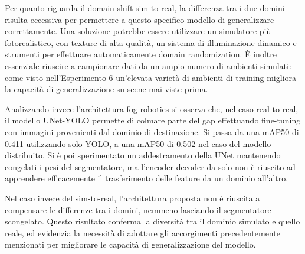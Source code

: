 \documentclass[12pt]{report}
\begin{document}
Per quanto riguarda il domain shift sim-to-real, la differenza tra i due domini risulta eccessiva per permettere a questo specifico modello di generalizzare correttamente. Una soluzione potrebbe essere utilizzare un simulatore più fotorealistico, con texture di alta qualità, un sistema di illuminazione dinamico e strumenti per effettuare automaticamente domain randomization. È inoltre essenziale riuscire a campionare dati da un ampio numero di ambienti simulati: come visto nell'\hyperref[sec:esperimento_6]{Esperimento 6} un'elevata varietà di ambienti di training migliora la capacità di generalizzazione su scene mai viste prima.

Analizzando invece l'architettura fog robotics si osserva che, nel caso real-to-real, il modello UNet-YOLO permette di colmare parte del gap effettuando fine-tuning con immagini provenienti dal dominio di destinazione. Si passa da una mAP50 di 0.411 utilizzando solo YOLO, a una mAP50 di 0.502 nel caso del modello distribuito. Si è poi sperimentato un addestramento della UNet mantenendo congelati i pesi del segmentatore, ma l'encoder-decoder da solo non è riuscito ad apprendere efficacemente il trasferimento delle feature da un dominio all'altro.

Nel caso invece del sim-to-real, l'architettura proposta non è riuscita a compensare le differenze tra i domini, nemmeno lasciando il segmentatore scongelato. Questo risultato conferma la diversità tra il dominio simulato e quello reale, ed evidenzia la necessità di adottare gli accorgimenti precedentemente menzionati per migliorare le capacità di generalizzazione del modello.

\beforebibliography



\closingpage
\end{document}
